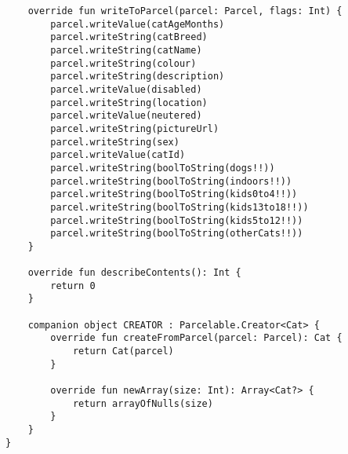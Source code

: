 \begin{verbatim}
    override fun writeToParcel(parcel: Parcel, flags: Int) {
        parcel.writeValue(catAgeMonths)
        parcel.writeString(catBreed)
        parcel.writeString(catName)
        parcel.writeString(colour)
        parcel.writeString(description)
        parcel.writeValue(disabled)
        parcel.writeString(location)
        parcel.writeValue(neutered)
        parcel.writeString(pictureUrl)
        parcel.writeString(sex)
        parcel.writeValue(catId)
        parcel.writeString(boolToString(dogs!!))
        parcel.writeString(boolToString(indoors!!))
        parcel.writeString(boolToString(kids0to4!!))
        parcel.writeString(boolToString(kids13to18!!))
        parcel.writeString(boolToString(kids5to12!!))
        parcel.writeString(boolToString(otherCats!!))
    }

    override fun describeContents(): Int {
        return 0
    }

    companion object CREATOR : Parcelable.Creator<Cat> {
        override fun createFromParcel(parcel: Parcel): Cat {
            return Cat(parcel)
        }

        override fun newArray(size: Int): Array<Cat?> {
            return arrayOfNulls(size)
        }
    }
}
\end{verbatim}

